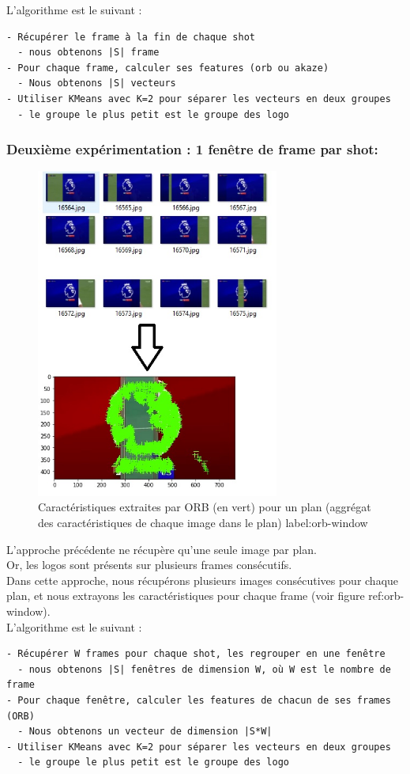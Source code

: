 \documentclass[11pt]{article}
\begin{document}
L'algorithme est le suivant :\\
\begin{verbatim}
- Récupérer le frame à la fin de chaque shot
  - nous obtenons |S| frame
- Pour chaque frame, calculer ses features (orb ou akaze)
  - Nous obtenons |S| vecteurs
- Utiliser KMeans avec K=2 pour séparer les vecteurs en deux groupes
  - le groupe le plus petit est le groupe des logo
\end{verbatim}

\subsubsection{Deuxième expérimentation : 1 fenêtre de frame par shot:}
\label{sec:orgf059b59}
\begin{figure}[htbp]
\centering
\includegraphics[width=8cm]{akaze_window_res.jpg}
\caption{Caractéristiques extraites par ORB (en vert) pour un plan (aggrégat des caractéristiques de chaque image dans le plan) label:orb-window}
\end{figure}
L'approche précédente ne récupère qu'une seule image par plan.\\
Or, les logos sont présents sur plusieurs frames consécutifs.\\
Dans cette approche, nous récupérons plusieurs images consécutives pour chaque plan, et nous extrayons les caractéristiques pour chaque frame (voir figure ref:orb-window).\\

L'algorithme est le suivant :\\
\begin{verbatim}
- Récupérer W frames pour chaque shot, les regrouper en une fenêtre
  - nous obtenons |S| fenêtres de dimension W, où W est le nombre de frame
- Pour chaque fenêtre, calculer les features de chacun de ses frames (ORB)
  - Nous obtenons un vecteur de dimension |S*W|
- Utiliser KMeans avec K=2 pour séparer les vecteurs en deux groupes
  - le groupe le plus petit est le groupe des logo
\end{verbatim}
\end{document}
